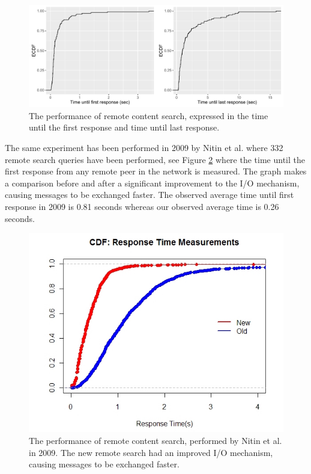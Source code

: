 \begin{figure}[!h]
	\centering
	\includegraphics[width=1.0\columnwidth]{images/experiments/cdf_remote_search}
	\caption{The performance of remote content search, expressed in the time until the first response and time until last response.}
	\label{fig:remote_search}
\end{figure}

The same experiment has been performed in 2009 by Nitin et al. where 332 remote search queries have been performed, see Figure \ref{fig:nitin_remote_search} where the time until the first response from any remote peer in the network is measured. The graph makes a comparison before and after a significant improvement to the I/O mechanism, causing messages to be exchanged faster. The observed average time until first response in 2009 is 0.81 seconds whereas our observed average time is 0.26 seconds.

\begin{figure}[!h]
	\centering
	\includegraphics[width=0.7\columnwidth]{images/experiments/nitin_remote_search}
	\caption{The performance of remote content search, performed by Nitin et al. in 2009. The new remote search had an improved I/O mechanism, causing messages to be exchanged faster.}
	\label{fig:nitin_remote_search}
\end{figure}

